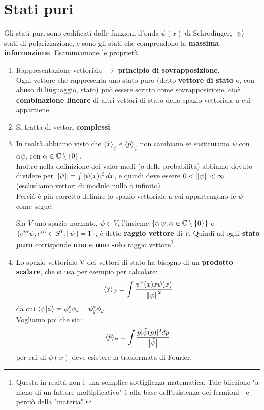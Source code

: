 \documentclass[FisicaTeorica.tex]{subfiles}
\begin{document}
\section{Stati puri}\label{sec:stati_puri}
Gli stati puri sono codificati dalle funzioni d'onda $\psi \left(x\right)$ di Schrodinger, $\ket{\psi}$ stati di polarizzazione, e sono gli stati che comprendono la \textbf{massima informazione}. Esaminiamone le proprietà.
\begin{enumerate}
    \item Rappresentazione vettoriale $\rightarrow$ \textbf{principio di sovrapposizione}.\\
    Ogni vettore che rappresenta uno stato puro (detto \textbf{vettore di stato} o, con abuso di linguaggio, stato) può essere scritto come sovrapposizione, cioè \textbf{combinazione lineare} di altri vettori di stato dello spazio vettoriale a cui appartiene.
    \item Si tratta di vettori \textbf{complessi}
    \item In realtà abbiamo visto che $\langle \hat{x}\rangle_\psi$ e $\langle \hat{p}\rangle_\psi$ non cambiano se sostituiamo $\psi$ con $\alpha \psi$, con $\alpha \in \mathbb{C}\setminus \{0\}$.\\
    Inoltre nella definizione dei valor medi (o delle probabilità) abbiamo dovuto dividere per $\left\lVert\psi\right\rVert = \int |\psi(x)|^2\, dx$, e quindi deve essere $0<\left\lVert\psi\right\rVert<\infty$ (escludiamo vettori di modulo nullo o infinito).\\
    Perciò è più corretto definire lo spazio vettoriale a cui appartengono le $\psi$ come segue.
    \vspace{-1em}
    \begin{dfn}
    Sia $V$ uno spazio normato, $\psi \in V$, l'insieme $\{\alpha\,\psi, \alpha \in \mathbb{C}\setminus \{0\}\}$ o $\{e^{i\alpha}\psi, e^{i\alpha} \in S^1, \left\lVert\psi\right\rVert = 1 \}$, è detto \textbf{raggio vettore} di $V$. Quindi ad ogni \textbf{stato puro} corrisponde \textbf{uno e uno solo} raggio vettore\footnote{Questa in realtà non è una semplice sottigliezza matematica. Tale biiezione "a meno di un fattore moltiplicativo" è alla base dell'esistenza dei fermioni - e  perciò della "materia".}.
    \end{dfn}
    \item Lo spazio vettoriale V dei vettori di stato ha bisogno di un \textbf{prodotto scalare}, che si usa per esempio per calcolare:
    \[
    \langle \hat{x}\rangle_\psi = \int \frac{\psi^*(x) x \psi(x)}{\left\lVert\psi\right\rVert^2}
    \]
    da cui $\braket{\psi|\phi} = \psi_x^* \phi_x + \psi_y^* \phi_y$.\\
    Vogliamo poi che sia:
    \[
    \langle \hat{p} \rangle_\psi = \int \frac{p|\tilde{\psi}(p)|^2 dp}{\left\lVert\tilde{\psi}\right\rVert}
    \]
    per cui di $\psi(x)$ deve esistere la trasformata di Fourier.
\end{enumerate}
\end{document}
